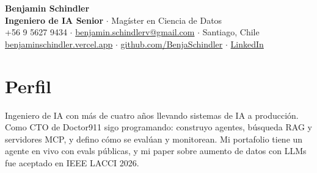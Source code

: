 \documentclass[a4paper,10pt]{article}
\begin{document}
\begin{center}
{\LARGE\bfseries Benjamin Schindler}\\[3pt]
\textbf{Ingeniero de IA Senior} $\cdot$ Magíster en Ciencia de Datos\\[4pt]
+56 9 5627 9434 $\cdot$ \href{mailto:benjamin.schindlerv@gmail.com}{benjamin.schindlerv@gmail.com} $\cdot$ Santiago, Chile\\[2pt]
\href{https://benjaminschindler.vercel.app}{benjaminschindler.vercel.app} $\cdot$ \href{https://github.com/BenjaSchindler}{github.com/BenjaSchindler} $\cdot$ \href{https://www.linkedin.com/in/benjamin-schindler-92881a2b2/}{LinkedIn}
\end{center}
\section*{Perfil}
Ingeniero de IA con más de cuatro años llevando sistemas de IA a producción. Como CTO de Doctor911 sigo programando: construyo agentes, búsqueda RAG y servidores MCP, y defino cómo se evalúan y monitorean. Mi portafolio tiene un agente en vivo con evals públicas, y mi paper sobre aumento de datos con LLMs fue aceptado en IEEE LACCI 2026.
\end{document}
